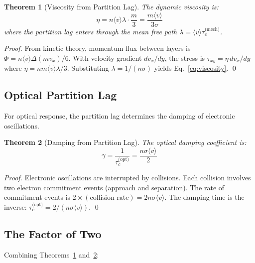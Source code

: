 \documentclass[twocolumn,10pt]{article}
\newtheorem{theorem}{Theorem}[section]
\theoremstyle{definition}
\theoremstyle{remark}
\begin{document}
\begin{theorem}[Viscosity from Partition Lag]
\label{thm:viscosity}
The dynamic viscosity is:
\begin{equation}
\eta = n \langle v \rangle \lambda \cdot \frac{m}{3} = \frac{m \langle v \rangle}{3\sigma}
\label{eq:viscosity}
\end{equation}
where the partition lag enters through the mean free path $\lambda = \langle v \rangle \tau_c^{\text{(mech)}}$.
\end{theorem}

\begin{proof}
From kinetic theory, momentum flux between layers is $\Phi = n \langle v \rangle \Delta(m v_x) / 6$. With velocity gradient $dv_x/dy$, the stress is $\tau_{xy} = \eta \, dv_x/dy$ where $\eta = nm\langle v\rangle \lambda / 3$. Substituting $\lambda = 1/(n\sigma)$ yields Eq.~\eqref{eq:viscosity}. \qed
\end{proof}

\subsection{Optical Partition Lag}

For optical response, the partition lag determines the damping of electronic oscillations.

\begin{theorem}[Damping from Partition Lag]
\label{thm:damping}
The optical damping coefficient is:
\begin{equation}
\gamma = \frac{1}{\tau_c^{\text{(opt)}}} = \frac{n \sigma \langle v \rangle}{2}
\label{eq:damping}
\end{equation}
\end{theorem}

\begin{proof}
Electronic oscillations are interrupted by collisions. Each collision involves two electron commitment events (approach and separation). The rate of commitment events is $2 \times (\text{collision rate}) = 2 n \sigma \langle v \rangle$. The damping time is the inverse: $\tau_c^{\text{(opt)}} = 2/(n\sigma\langle v\rangle)$. \qed
\end{proof}

\subsection{The Factor of Two}

Combining Theorems~\ref{thm:viscosity} and~\ref{thm:damping}:
\end{document}
